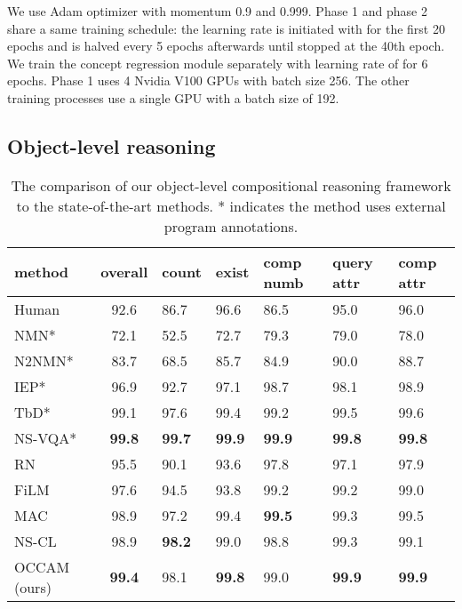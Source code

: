\documentclass[final]{cvpr}
\begin{document}
We use Adam optimizer \cite{kingma2014adam} with momentum 0.9 and 0.999. Phase 1 and phase 2 share a same training schedule: the learning rate is initiated with  for the first 20 epochs and is halved every 5 epochs afterwards until stopped at the 40th epoch. We train the concept regression module separately with learning rate of  for 6 epochs. Phase 1 uses 4 Nvidia V100 GPUs with batch size 256. The other training processes use a single GPU with a batch size of 192.

\subsection{Object-level reasoning}
\begin{table}[t!]
    \centering
    \caption{The comparison of our object-level compositional reasoning framework to the state-of-the-art methods. * indicates the method uses external program annotations.}
    \small
    \begin{tabular}{l|c|p{0.45cm}p{0.45cm}p{0.53cm}p{0.53cm}p{0.53cm}}
        \toprule
         method & overall & count & exist & comp numb & query attr & comp attr  \\
         \midrule
         Human \cite{johnson2017inferring} & 92.6 & 86.7 & 96.6 & 86.5 & 95.0 & 96.0 \\
         \midrule
NMN* \cite{andreas2016neural} & 72.1 & 52.5 & 72.7 & 79.3 & 79.0 & 78.0 \\
         N2NMN* \cite{hu2017learning} &83.7 & 68.5 & 85.7 & 84.9 & 90.0 & 88.7 \\ 
         IEP* \cite{johnson2017inferring} & 96.9 & 92.7 & 97.1 & 98.7 & 98.1 & 98.9 \\
         TbD* \cite{Mascharka_2018_CVPR} & 99.1 & 97.6 & 99.4 & 99.2 & 99.5 & 99.6 \\
         NS-VQA* \cite{yi2018neural} & \textbf{99.8} & \textbf{99.7} & \textbf{99.9} & \textbf{99.9} & \textbf{99.8} & \textbf{99.8}\\ 
         \midrule
         RN \cite{santoro2017simple} & 95.5 & 90.1 & 93.6 & 97.8 & 97.1 & 97.9 \\
         FiLM \cite{perez2018film} & 97.6 & 94.5 & 93.8 & 99.2 & 99.2 & 99.0 \\
         MAC \cite{hudson2018compositional} & 98.9 & 97.2 & 99.4 & \textbf{99.5} & 99.3 & 99.5 \\
         NS-CL \cite{mao2018neuro} & 98.9 & \textbf{98.2} & 99.0 & 98.8 & 99.3 & 99.1\\
         \midrule
         OCCAM (ours) & \textbf{99.4}&98.1&\textbf{99.8}&99.0&\textbf{99.9}&\textbf{99.9}\\

\end{tabular}
\end{table}
\end{document}
